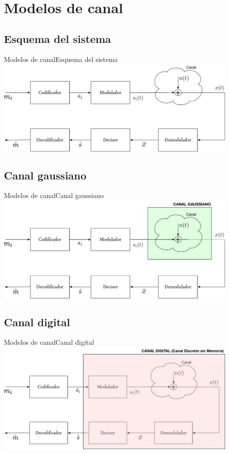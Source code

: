 \documentclass[10pt,compress]{beamer} %
\begin{document}
\section{Modelos de canal}
\subsection{Esquema del sistema}
\begin{frame}{Modelos de canal}{Esquema del sistema}
  \centering \includegraphics[width=0.9\textwidth]{./Figuras/Sistema1.pdf}
\end{frame}

\subsection{Canal gaussiano}
\begin{frame}{Modelos de canal}{Canal gaussiano}
  \centering \includegraphics[width=0.9\textwidth]{./Figuras/Sistema2.pdf}
\end{frame}

\subsection{Canal digital}
\begin{frame}{Modelos de canal}{Canal digital}
  \centering \includegraphics[width=0.9\textwidth]{./Figuras/Sistema3.pdf}
\end{frame}
\end{document}
